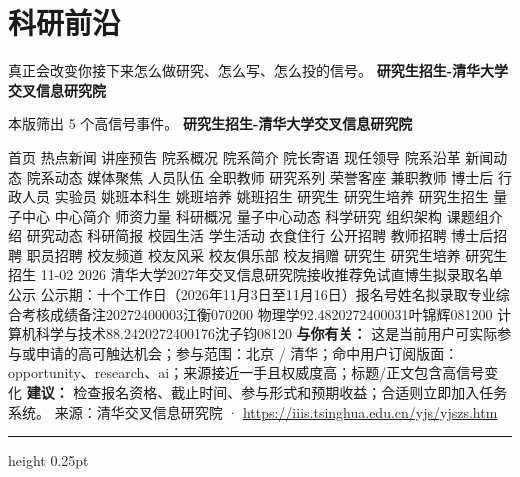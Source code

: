 \documentclass[10.5pt]{ctexart}
\begin{document}
\section*{科研前沿}
{\color{ormuted} 真正会改变你接下来怎么做研究、怎么写、怎么投的信号。}
\vspace{2mm}
{\LARGE\bfseries 研究生招生-清华大学交叉信息研究院}\par
\vspace{1mm}
{\color{ormuted} 本版筛出 5 个高信号事件。}
\vspace{3mm}
{\Large\bfseries 研究生招生-清华大学交叉信息研究院}\par
首页 热点新闻 讲座预告 院系概况 院系简介 院长寄语 现任领导 院系沿革 新闻动态 院系动态 媒体聚焦 人员队伍 全职教师 研究系列 荣誉客座 兼职教师 博士后 行政人员 实验员 姚班本科生 姚班培养 姚班招生 研究生 研究生培养 研究生招生 量子中心 中心简介 师资力量 科研概况 量子中心动态 科学研究 组织架构 课题组介绍 研究动态 科研简报 校园生活 学生活动 衣食住行 公开招聘 教师招聘 博士后招聘 职员招聘 校友频道 校友风采 校友俱乐部 校友捐赠 研究生 研究生培养 研究生招生 11-02 2026 清华大学2027年交叉信息研究院接收推荐免试直博生拟录取名单公示 公示期：十个工作日（2026年11月3日至11月16日）报名号姓名拟录取专业综合考核成绩备注20272400003江衡070200 物理学92.4820272400031叶锦辉081200 计算机科学与技术88.2420272400176沈子钧08120
\textbf{与你有关：} 这是当前用户可实际参与或申请的高可触达机会；参与范围：北京 / 清华；命中用户订阅版面：opportunity、research、ai；来源接近一手且权威度高；标题/正文包含高信号变化
\textbf{建议：} 检查报名资格、截止时间、参与形式和预期收益；合适则立即加入任务系统。
{\footnotesize\color{ormuted} 来源：清华交叉信息研究院 · \url{https://iiis.tsinghua.edu.cn/yjs/yjszs.htm}}
\vspace{4mm}
\hrule height 0.25pt
\vspace{3mm}
\end{document}
